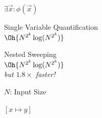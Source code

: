 \documentclass[english, aspectratio=169]{beamer}
\begin{document}
\begin{frame}{$\exists \vec{x} : \phi(\vec{x})$}
  \centering

  {\Large Single Variable Quantification}\\\vspace{5pt}
  {\LARGE $\Oh{N^{2^k} \log(N^{2^k})}$}\\

  \vspace{20pt}

  {\Large Nested Sweeping}\\\vspace{5pt}
  {\LARGE $\Oh{N^{2^k} \log(N^{2^k})}$}\\
  {\emph{but $1.8 \times$ faster!}}

  \vspace{20pt}

  {\large $N$: Input Size}
\end{frame}

\begin{frame}
  \centering\Huge $[x \mapsto y]$
\end{frame}
\end{document}
